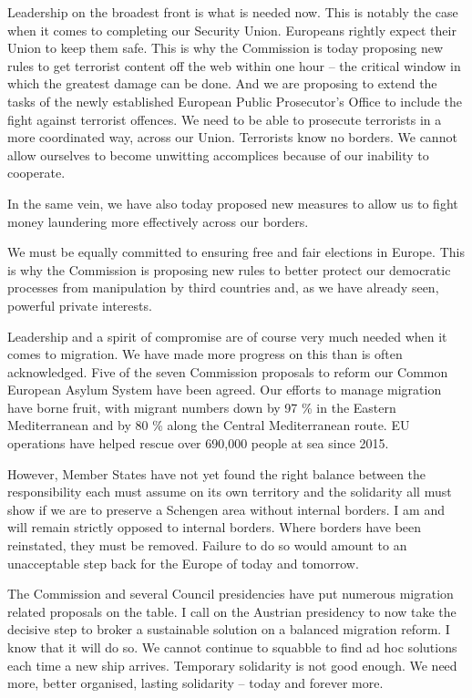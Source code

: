 \documentclass[a4paper,11pt]{article}
\begin{document}
Leadership on the broadest front is what is needed now. This is notably the case when it comes to completing our Security Union. Europeans rightly expect their Union to keep them safe. This is why the Commission is today proposing new rules to get terrorist content off the web within one hour – the critical window in which the greatest damage can be done. And we are proposing to extend the tasks of the newly established European Public Prosecutor's Office to include the fight against terrorist offences. We need to be able to prosecute terrorists in a more coordinated way, across our Union. Terrorists know no borders. We cannot allow ourselves to become unwitting accomplices because of our inability to cooperate.

In the same vein, we have also today proposed new measures to allow us to fight money laundering more effectively across our borders.

We must be equally committed to ensuring free and fair elections in Europe. This is why the Commission is proposing new rules to better protect our democratic processes from manipulation by third countries and, as we have already seen, powerful private interests.

Leadership and a spirit of compromise are of course very much needed when it comes to migration. We have made more progress on this than is often acknowledged. Five of the seven Commission proposals to reform our Common European Asylum System have been agreed. Our efforts to manage migration have borne fruit, with migrant numbers down by 97 \% in the Eastern Mediterranean and by 80 \% along the Central Mediterranean route. EU operations have helped rescue over 690,000 people at sea since 2015.

However, Member States have not yet found the right balance between the responsibility each must assume on its own territory and the solidarity all must show if we are to preserve a Schengen area without internal borders. I am and will remain strictly opposed to internal borders. Where borders have been reinstated, they must be removed. Failure to do so would amount to an unacceptable step back for the Europe of today and tomorrow.

The Commission and several Council presidencies have put numerous migration related proposals on the table. I call on the Austrian presidency to now take the decisive step to broker a sustainable solution on a balanced migration reform. I know that it will do so. We cannot continue to squabble to find ad hoc solutions each time a new ship arrives. Temporary solidarity is not good enough. We need more, better organised, lasting solidarity – today and forever more.
\end{document}
